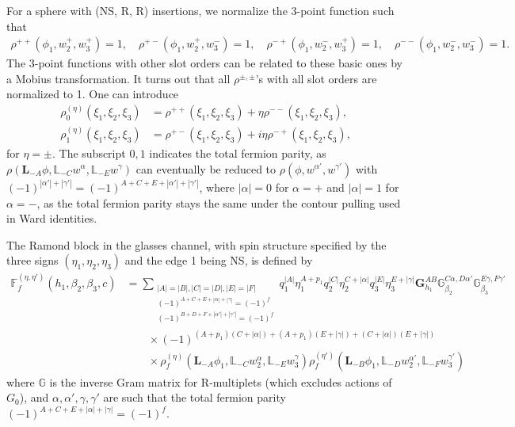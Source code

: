 \documentclass[12pt]{article}
\newcommand{\ie}{\begin{equation}\begin{aligned}}
\newcommand{\fe}{\end{aligned}\end{equation}}
\numberwithin{equation}{section}
\begin{document}
For a sphere with (NS, R, R) insertions, we normalize the 3-point function such that
\ie
\rho^{++}(\phi_1, w^+_2, w_3^+) = 1,\quad \rho^{+-}(\phi_1, w^+_2, w_3^-) = 1,\quad \rho^{-+}(\phi_1, w^-_2, w_3^+) = 1,\quad \rho^{--}(\phi_1, w^-_2, w_3^-) = 1.
\fe
The 3-point functions with other slot orders can be related to these basic ones by a Mobius transformation. It turns out that all $\rho^{\pm, \pm}$'s with all slot orders are normalized to 1. One can introduce \cite{1012.2974}
\ie
\rho_{0}^{(\eta)}(\xi_1, \xi_2, \xi_3) &= \rho^{++}(\xi_1, \xi_2, \xi_3) + \eta \rho^{--}(\xi_1, \xi_2, \xi_3),\\ \rho_{1}^{(\eta)}(\xi_1, \xi_2, \xi_3) &= \rho^{+-}(\xi_1, \xi_2, \xi_3) + i\eta \rho^{-+}(\xi_1, \xi_2, \xi_3),
\fe
for $\eta = \pm$. The subscript $0,1$ indicates the total fermion parity, as $\rho(\mathbf{L}_{-A}\phi, \mathbb{L}_{-C}w^\alpha, \mathbb{L}_{-E}w^\gamma)$ can eventually be reduced to $\rho(\phi, w^{\alpha'}, w^{\gamma'})$ with $(-1)^{|\alpha'|+|\gamma'|} = (-1)^{A+C+E+|\alpha'|+|\gamma'|}$, where $|\alpha|=0$ for $\alpha = +$ and $|\alpha|=1$ for $\alpha = -$, as the total fermion parity stays the same under the contour pulling used in Ward identities. 

The Ramond block in the glasses channel, with spin structure specified by the three signs $(\eta_1, \eta_2, \eta_3)$ and the edge 1 being NS, is defined by
\ie \label{Rblock}
\mathbb{F}_f^{(\eta, \eta')}(h_1, \beta_2, \beta_3, c) &= \sum_{\substack{|A|=|B|, |C|=|D|, |E|=|F|\\ (-1)^{A+C+E+|\alpha|+|\gamma|}=(-1)^f\\(-1)^{B+D+F+|\alpha'|+|\gamma'|}=(-1)^f}} q_1^{|A|} \eta_1^{A+p_1} q_2^{|C|} \eta_2^{C+|\alpha|} q_3^{|E|} \eta_3^{E+|\gamma|} \mathbf{G}^{AB}_{h_1} \mathbb{G}^{C\alpha, D\alpha'}_{\beta_2} \mathbb{G}^{E\gamma, F\gamma'}_{\beta_3}\\
&\quad\quad \times (-1)^{(A+p_1)(C+|\alpha|)+(A+p_1)(E+|\gamma|)+(C+|\alpha|)(E+|\gamma|)}\\
&\quad\quad \times \rho_f^{(\eta)}(\mathbf{L}_{-A}\phi_1, \mathbb{L}_{-C}w^\alpha_2, \mathbb{L}_{-E}w^\gamma_3)\rho_f^{(\eta')}(\mathbf{L}_{-B}\phi_1, \mathbb{L}_{-D}w^{\alpha'}_2, \mathbb{L}_{-F}w^{\gamma'}_3)
\
\fe
where $\mathbb{G}$ is the inverse Gram matrix for R-multiplets (which excludes actions of $G_0$), and $\alpha,\alpha', \gamma, \gamma'$ are such that the total fermion parity $(-1)^{A+C+E+|\alpha|+|\gamma|}=(-1)^f$. 
\end{document}
